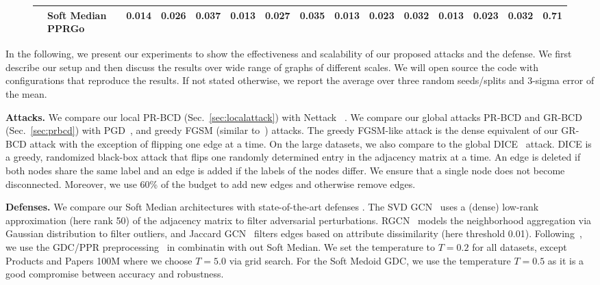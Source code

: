 \documentclass[sigconf, review]{acmart}
\begin{document}
\begin{figure*}[ht]
\begin{minipage}{0.56\textwidth}
{\begin{tabular}{llccccccccccccc}
                                  & Soft Median PPRGo &       \textbf{0.014} &              0.026 &     \textbf{0.037} &                  0.013 &     \textbf{0.027} &              0.035 &                       0.013 &              0.023 &              0.032 &                       0.013 &                       0.023 &                       0.032 &          0.71 \\
\bottomrule
\end{tabular}
}
\end{minipage}
\end{figure*}


In the following, we present our experiments to show the effectiveness and scalability of our proposed attacks and the defense. We first describe our setup and then discuss the results over wide range of graphs of different scales. We will open source the code with configurations that reproduce the results. If not stated otherwise, we report the average over three random seeds/splits and 3-sigma error of the mean.

\textbf{Attacks.} We compare our local PR-BCD (Sec.~\ref{sec:localattack}) with Nettack
~\cite{Zugner2018}. We compare our global attacks PR-BCD and GR-BCD (Sec.~\ref{sec:prbcd}) with PGD~\citep{Xu2019a}, and greedy FGSM (similar to~\citet{Dai2018}) attacks. The greedy FGSM-like attack is the dense equivalent of our GR-BCD attack with the exception of flipping one edge at a time. On the large datasets, we also compare to the global DICE~\citep{Waniek2018} attack. DICE is a greedy, randomized black-box attack that flips one randomly determined entry in the adjacency matrix at a time. An edge is deleted if both nodes share the same label and an edge is added if the labels of the nodes differ. We ensure that a single node does not become disconnected. Moreover, we use 60\% of the budget to add new edges and otherwise remove edges.

\textbf{Defenses.} We compare our Soft Median architectures with state-of-the-art defenses \citep{Entezari2020, Geisler2020, Wu2019, Zhu2019}.
The SVD GCN~\citep{Entezari2020} uses a (dense) low-rank approximation (here rank 50) of the adjacency matrix to filter adversarial perturbations.
RGCN~\citep{Zhu2019} models the neighborhood aggregation via Gaussian distribution to filter outliers, and Jaccard GCN~\citep{Wu2019} filters edges based on attribute dissimilarity (here threshold 0.01). Following~\cite{Geisler2020}, we use the GDC/PPR preprocessing~\cite{Klicpera2019a} in combinatin with out Soft Median. 
We set the temperature to \(T=0.2\) for all datasets, except Products and Papers 100M where we choose \(T=5.0\) via grid search. For the Soft Medoid GDC, we use the temperature \(T=0.5\) as it is a good compromise between accuracy and robustness.
\end{document}
